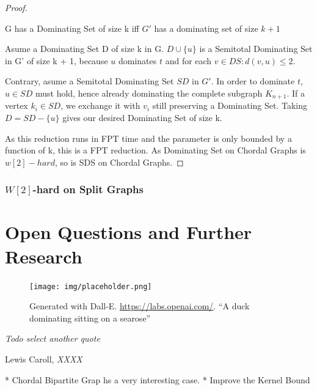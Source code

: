 \begin{proof}
    \begin{corollary}
    G has a Dominating Set of size k iff $G'$ has a dominating set of size $k+1$
    \end{corollary}
    \begin{subproof}
    Asume a Dominating Set D of size k in G. $D \cup \{u\}$ is a Semitotal Dominating Set in G' of size k + 1, because $u$ dominates $t$ and for each $v \in DS: d(v, u) \leq 2$.

    Contrary, asume a Semitotal Dominating Set $SD$ in $G'$. In order to dominate $t$, $u \in SD$ must hold, hence already dominating the complete subgraph $K_{n+1}$. If a vertex $k_i \in SD$, we exchange it with $v_i$ still preserving a Dominating Set. Taking $D = SD - \{ u \}$ gives our desired Dominating Set of size k.
    \end{subproof}
    As this reduction runs in FPT time and the parameter is only bounded by a function of k, this is a FPT reduction. As Dominating Set on Chordal Graphs is $w[2]-hard$, so is SDS on Chordal Graphs.

\end{proof}

\subsection{\hmath $W[2]$-hard on Split Graphs}

\chapter{Open Questions and Further Research}

\vspace*{-50pt}

\begin{figure}[ht]
        \texttt{[image: img/placeholder.png]}
        \captionsetup{textformat=empty,labelformat=blank}
        \caption{Generated with Dall-E. \url{https://labs.openai.com/}. ``A duck dominating sitting on a searose''}
\end{figure}

\epigraph{\itshape Todo select another quote}{Lewis Caroll, \textit{XXXX}}

* Chordal Bipartite Grap hs a very interesting case.
* Improve the Kernel Bound

